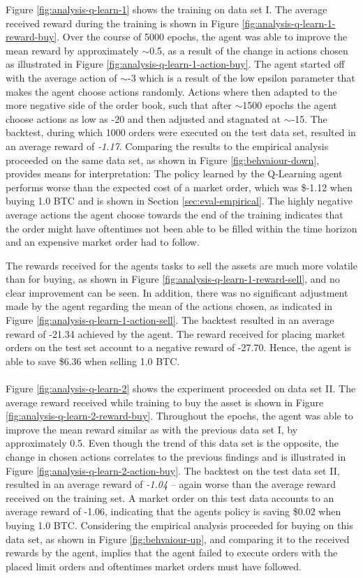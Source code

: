 Figure \ref{fig:analysis-q-learn-1} shows the training on data set I.
The average received reward during the training is shown in Figure \ref{fig:analysis-q-learn-1-reward-buy}.
Over the course of 5000 epochs, the agent was able to improve the mean reward by approximately $\sim$0.5, as a result of the change in actions chosen as illustrated in Figure \ref{fig:analysis-q-learn-1-action-buy}.
The agent started off with the average action of $\sim$-3 which is a result of the low epsilon parameter that makes the agent choose actions randomly.
Actions where then adapted to the more negative side of the order book, such that after $\sim$1500 epochs the agent choose actions as low as -20 and then adjusted and stagnated at $\sim$-15.
The backtest, during which 1000 orders were executed on the test data set, resulted in an average reward of \textit{-1.17}.
Comparing the results to the empirical analysis proceeded on the same data set, as shown in Figure \ref{fig:behvaiour-down}, provides means for interpretation:
The policy learned by the Q-Learning agent performs worse than the expected cost of a market order, which was \$-1.12 when buying 1.0 BTC and is shown in Section \ref{sec:eval-empirical}.
The highly negative average actions the agent choose towards the end of the training indicates that the order might have oftentimes not been able to be filled within the time horizon and an expensive market order had to follow.

The rewards received for the agents tasks to sell the assets are much more volatile than for buying, as shown in Figure \ref{fig:analysis-q-learn-1-reward-sell}, and no clear improvement can be seen.
In addition, there was no significant adjustment made by the agent regarding the mean of the actions chosen, as indicated in Figure \ref{fig:analysis-q-learn-1-action-sell}.
The backtest resulted in an average reward of -21.34 achieved by the agent.
The reward received for placing market orders on the test set account to a negative reward of -27.70.
Hence, the agent is able to save \$6.36 when selling 1.0 BTC.
\\
\\
Figure \ref{fig:analysis-q-learn-2} shows the experiment proceeded on data set II.
The average reward received while training to buy the asset is shown in Figure \ref{fig:analysis-q-learn-2-reward-buy}.
Throughout the epochs, the agent was able to improve the mean reward similar as with the previous data set I, by approximately 0.5.
Even though the trend of this data set is the opposite, the change in chosen actions correlates to the previous findings and is illustrated in Figure \ref{fig:analysis-q-learn-2-action-buy}.
The backtest on the test data set II, resulted in an average reward of \textit{-1.04} -- again worse than the average reward received on the training set.
A market order on this test data accounts to an average reward of -1.06, indicating that the agents policy is saving \$0.02 when buying 1.0 BTC.
Considering the empirical analysis proceeded for buying on this data set, as shown in Figure \ref{fig:behvaiour-up}, and comparing it to the received rewards by the agent, implies that the agent failed to execute orders with the placed limit orders and oftentimes market orders must have followed.

